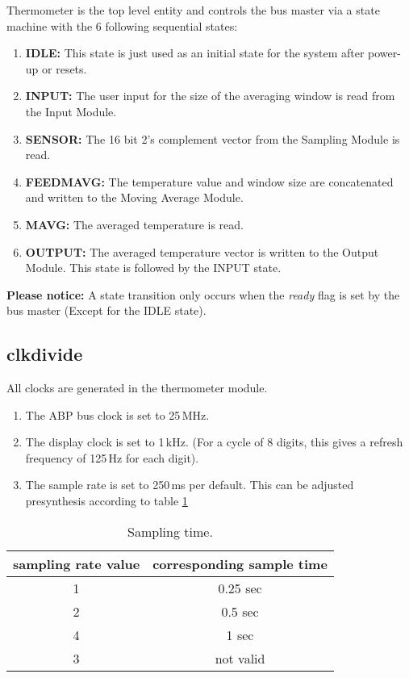 \documentclass[%
	a4paper,
]
{article}
\begin{document}
Thermometer is the top level entity and controls the bus master via a state machine with the 6 following sequential states:
\begin{enumerate}
	\item \textbf{IDLE:} This state is just used as an initial state for the system after power-up or resets.
	\item \textbf{INPUT:} The user input for the size of the averaging window is read from the Input Module.
	\item \textbf{SENSOR:} The 16 bit 2's complement vector from the Sampling Module is read.
	\item \textbf{FEEDMAVG:} The temperature value and window size are concatenated and written to the Moving Average Module.
	\item \textbf{MAVG:} The averaged temperature is read.
	\item \textbf{OUTPUT:} The averaged temperature vector is written to the Output Module. This state is followed by the INPUT state.
\end{enumerate}
\textbf{Please notice:} A state transition only occurs when the \textit{ready} flag is set by the bus master (Except for the IDLE state).\newline

\subsection{clkdivide}
All clocks are generated in the thermometer module.
\begin{enumerate}
	\item The ABP bus clock is set to 25\,MHz.
	\item The display clock is set to 1\,kHz. (For a cycle of 8 digits, this gives a refresh frequency of 125\,Hz for each digit).
	\item The sample rate is set to 250\,ms per default. This can be adjusted presynthesis according to table \ref{tab:sampling}
\end{enumerate}


\begin{table}[H]
\begin{center}
\begin{tabular}{|c|c|}

\hline
sampling rate value & corresponding sample time \\
\hline
1 & 0.25 sec \\
2 & 0.5 sec \\
4 & 1 sec \\
3 & not valid \\
\hline

\end{tabular}
\caption{Sampling time.}
\label{tab:sampling}
\end{center}
\end{table}
\end{document}
